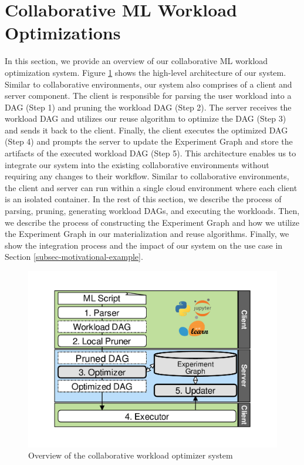 \section{Collaborative ML Workload Optimizations} \label{sec-ml-workloads}
In this section, we provide an overview of our collaborative ML workload optimization system.
Figure \ref{system-workflow} shows the high-level architecture of our system.
Similar to collaborative environments, our system also comprises of a client and server component.
The client is responsible for parsing the user workload into a DAG (Step 1) and pruning the workload DAG (Step 2).
The server receives the workload DAG and utilizes our reuse algorithm to optimize the DAG (Step 3) and sends it back to the client.
Finally, the client executes the optimized DAG (Step 4) and prompts the server to update the Experiment Graph and store the artifacts of the executed workload DAG (Step 5).
This architecture enables us to integrate our system into the existing collaborative environments without requiring any changes to their workflow.
Similar to collaborative environments, the client and server can run within a single cloud environment where each client is an isolated container.
In the rest of this section, we describe the process of parsing, pruning, generating workload DAGs, and executing the workloads.
Then, we describe the process of constructing the Experiment Graph and how we utilize the Experiment Graph in our materialization and reuse algorithms. 
Finally, we show the integration process and the impact of our system on the use case in Section \ref{subsec-motivational-example}.

\begin{figure}
\centering
\includegraphics[width=0.9\columnwidth]{../images/system-workflow}
\caption{Overview of the collaborative workload optimizer system}
\label{system-workflow}
\end{figure}


